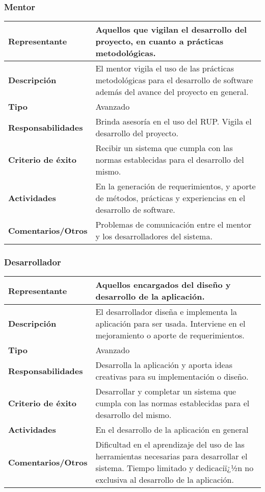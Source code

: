 \documentclass{article}
\begin{document}
	\subsubsection{Mentor}
	\begin{center}
		\begin{tabular}{| p{} | p{}|}
		 \hline  %
		\raggedright
		\textbf{Representante} & Aquellos que vigilan el desarrollo del proyecto, en cuanto a prácticas metodológicas.
		\\ \hline
		\textbf{Descripción} & El mentor vigila el uso de las prácticas metodológicas para el desarrollo de software además del avance del proyecto en general.\\ \hline
		\textbf{Tipo} & Avanzado \\ \hline
		\textbf{Responsabilidades} & Brinda asesoría en el uso del RUP. Vigila el desarrollo del proyecto.\\ \hline
		\textbf{Criterio de éxito} & Recibir un sistema que cumpla con las normas establecidas para el desarrollo del mismo. 
		\\ \hline
		\textbf{Actividades} & En la generación de requerimientos, y aporte de métodos, prácticas y experiencias en el desarrollo de software. \\ \hline
		\textbf{Comentarios/Otros} & Problemas de comunicación entre el mentor y los desarrolladores del sistema. \\ \hline
		\end{tabular}
	\end{center}

	\subsubsection{Desarrollador}
	\begin{center}
		\begin{tabular}{| p{} | p{}|}
		 \hline  %
		\raggedright
		\textbf{Representante} & Aquellos encargados del diseño y desarrollo de la aplicación.\\ \hline
		\textbf{Descripción} & El desarrollador diseña e implementa la aplicación para ser usada. Interviene en el mejoramiento o aporte de requerimientos.\\ \hline
		\textbf{Tipo} & Avanzado \\ \hline
		\textbf{Responsabilidades} & Desarrolla la aplicación y aporta ideas creativas para su implementación o diseño.
		\\ \hline
		\textbf{Criterio de éxito} & Desarrollar y completar un sistema que cumpla con las normas establecidas para el desarrollo del mismo. 
		\\ \hline
		\textbf{Actividades} & En el desarrollo de la aplicación en general
		\\ \hline
		\textbf{Comentarios/Otros} & Dificultad en el aprendizaje del uso de las herramientas necesarias para desarrollar el sistema.
		Tiempo limitado y dedicaciï¿½n no exclusiva al desarrollo de la aplicación. \\ \hline
		\end{tabular}
	\end{center}
\end{document}
